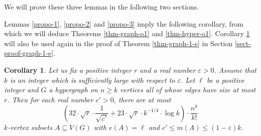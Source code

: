 \documentclass[11pt]{article}
\newtheorem{corollary}[theorem]{Corollary}
\theoremstyle{definition}
\numberwithin{equation}{section}
\begin{document}
We will prove these three lemmas in the following two sections.

Lemmas \ref{propo-1}, \ref{propo-2} and \ref{propo-3} imply the following corollary, from which we will deduce Theorems \ref{thm-graph-o1} and \ref{thm-hyper-o1}. Corollary \ref{coro-propo-o1} will also be used again in the proof of Theorem \ref{thm-graph-1-e} in Section \ref{sect-proof-graph-1-e}.

\begin{corollary}\label{coro-propo-o1}Let us fix a positive integer $r$ and a real number $\varepsilon>0$. Assume that $k$ is an integer which is sufficiently large with respect to $\varepsilon$. Let $\ell$ be a positive integer and $G$ a hypergraph on $n \geq k$ vertices all of whose edges have size at most $r$. Then for each real number $c'>0$, there are at most
\[\left(32\cdot \sqrt{r}\cdot \frac{1}{\sqrt{c'}}+23 \cdot \sqrt{r}\cdot k^{-1/4}\cdot \log k\right)\cdot \frac{n^k}{k!} \]
$k$-vertex subsets $A\subseteq V(G)$ with $e(A)=\ell$ and $c' \leq m(A)\leq (1-\varepsilon) k$.
\end{corollary}
\end{document}
